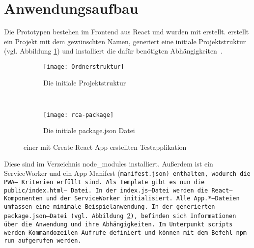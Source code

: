 \section{Anwendungsaufbau}
Die Prototypen bestehen im Frontend aus React und wurden mit  erstellt.  erstellt ein Projekt mit dem gewünschten Namen, generiert eine initiale Projektstruktur (vgl. Abbildung \ref{fig:init}) und installiert die dafür benötigten Abhängigkeiten~\cite{create-react}.
\begin{figure}[H]
  \centering
  \begin{subfigure}[t]{0.4\textwidth}
          \texttt{[image: Ordnerstruktur]}
          \caption{Die initiale Projektstruktur}
          \label{fig:init}
  \end{subfigure}
  ~ 
  \begin{subfigure}[t]{0.4\textwidth}
          \texttt{[image: rca-package]}
          \caption{Die initiale package.json Datei}
          \label{fig:init2}
  \end{subfigure}
  \grayRule
  \caption[Create React App: initiale Testapplikation]{einer mit Create React App erstellten Testapplikation}
  \label{fig:create-react-app}
\end{figure}
Diese sind im Verzeichnis node\_modules installiert.
Außerdem ist ein ServiceWorker und ein App Manifest (\tt{manifest.json}) enthalten, wodurch die \gls{PWA}-- Kriterien erfüllt sind.
Als Template gibt es nun die \tt{public/index.html}-- Datei. In der \tt{index.js}--Datei werden die React--Komponenten und der ServiceWorker initialisiert.
Alle \tt{App.*}--Dateien umfassen eine minimale Beispielanwendung.
In der generierten \tt{package.json}--Datei (vgl. Abbildung \ref{fig:init2}), befinden sich Informationen über die Anwendung und ihre Abhängigkeiten. Im Unterpunkt \tt{scripts} werden Kommandozeilen-Aufrufe definiert und können mit dem Befehl \tt{npm run} aufgerufen werden.
%
%

%
%
%
